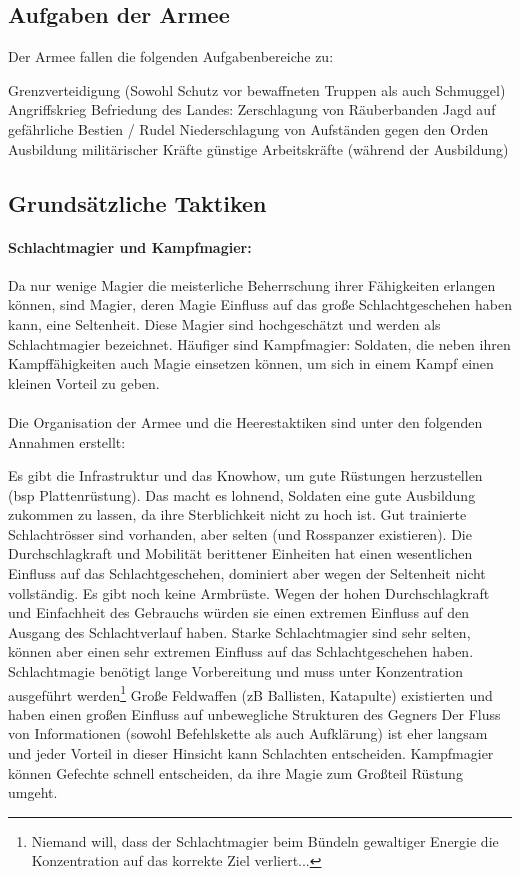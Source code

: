\subsection{Aufgaben der Armee}
Der Armee fallen die folgenden Aufgabenbereiche zu:
\begin{outline}
	\1 Grenzverteidigung (Sowohl Schutz vor bewaffneten Truppen als auch Schmuggel)
	\1 Angriffskrieg 
	\1 Befriedung des Landes:
		\2 Zerschlagung von Räuberbanden 
		\2 Jagd auf gefährliche Bestien / Rudel
		\2 Niederschlagung von Aufständen gegen den Orden
	\1 Ausbildung militärischer Kräfte
	\1 günstige Arbeitskräfte (während der Ausbildung)
\end{outline}

\subsection{Grundsätzliche Taktiken}
\paragraph{Schlachtmagier und Kampfmagier:}
Da nur wenige Magier die meisterliche Beherrschung ihrer Fähigkeiten erlangen können, sind Magier, deren Magie Einfluss auf das große Schlachtgeschehen haben kann, eine Seltenheit. 
Diese Magier sind hochgeschätzt und werden als Schlachtmagier bezeichnet. 
Häufiger sind Kampfmagier: Soldaten, die neben ihren Kampffähigkeiten auch Magie einsetzen können, um sich in einem Kampf einen kleinen Vorteil zu geben.
\\ \\
Die Organisation der Armee und die Heerestaktiken sind unter den folgenden Annahmen erstellt:
\begin{outline}
	\1 Es gibt die Infrastruktur und das Knowhow, um gute Rüstungen herzustellen (bsp Plattenrüstung). 
		Das macht es lohnend, Soldaten eine gute Ausbildung zukommen zu lassen, da ihre Sterblichkeit nicht zu hoch ist.
	\1 Gut trainierte Schlachtrösser sind vorhanden, aber selten (und Rosspanzer existieren). 
		Die Durchschlagkraft und Mobilität berittener Einheiten hat einen wesentlichen Einfluss auf das Schlachtgeschehen, dominiert aber wegen der Seltenheit nicht vollständig.
	\1 Es gibt noch keine Armbrüste. Wegen der hohen Durchschlagkraft und Einfachheit des Gebrauchs würden sie einen extremen Einfluss auf den Ausgang des Schlachtverlauf haben.
	\1 Starke Schlachtmagier sind sehr selten, können aber einen sehr extremen Einfluss auf das Schlachtgeschehen haben. 
		Schlachtmagie benötigt lange Vorbereitung und muss unter Konzentration ausgeführt werden\footnote{Niemand will, dass der Schlachtmagier beim Bündeln gewaltiger Energie die Konzentration auf das korrekte Ziel verliert...}
	\1 Große Feldwaffen (zB Ballisten, Katapulte) existierten und haben einen großen Einfluss auf unbewegliche Strukturen des Gegners
	\1 Der Fluss von Informationen (sowohl Befehlskette als auch Aufklärung) ist eher langsam und jeder Vorteil in dieser Hinsicht kann Schlachten entscheiden.
	\1 Kampfmagier können Gefechte schnell entscheiden, da ihre Magie zum Großteil Rüstung umgeht. 
\end{outline}

